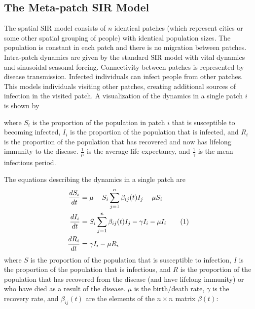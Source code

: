 \documentclass[twocolumn,nofootinbib,showkeys,twoside,floatfix,unsortedaddress,flushbottom,10pt,aps,pra]{report}
\newcommand\numberthis{\addtocounter{equation}{1}\tag{\theequation}}
\begin{document}
\subsection{The Meta-patch SIR Model} 
\indent
The spatial SIR model consists of $n$ identical patches (which represent cities or some other spatial grouping of people) with identical population sizes. The population is constant in each patch and there is no migration between patches. Intra-patch dynamics are given by the standard SIR model with vital dynamics and sinusoidal seasonal forcing. Connectivity between patches is represented by disease transmission. Infected individuals can infect people from other patches. This models individuals visiting other patches, creating additional sources of infection in the visited patch. 
A visualization of the dynamics in a single patch $i$ is shown by
\begin{center}
\end{center}
\qquad
where $S_i$ is the proportion of the population in patch $i$ that is susceptible to becoming infected, $I_i$ is the proportion of the population that is infected, and $R_i$ is the proportion of the population that has recovered and now has lifelong immunity to the disease. $\frac{1}{\mu}$ is the average life expectancy, and $\frac{1}{\gamma}$ is the mean infectious period.
\par
 \smallskip \qquad
The equations describing the dynamics in a single patch are
\begin{align*}
  \frac{dS_i}{dt} &= \mu - S_i\sum\limits_{j=1}^{n}\beta_{ij}(t) I_j -\mu S_i \\ 
  \frac{dI_i}{dt} &= S_i\sum\limits_{j=1}^{n}\beta_{ij}(t) I_j -\gamma I_i - \mu I_i  \numberthis \label{model} \\
  \frac{dR_i}{dt} &= \gamma I_i -\mu R_i      
\end{align*}
where $S$ is the proportion of the population that is susceptible to infection, $I$ is the proportion of the population that is infectious, and $R$ is the proportion of the population that has recovered from the disease (and  have lifelong immunity) or who have died as a result of the disease. $\mu$ is the birth/death rate, $\gamma$ is the recovery rate, and $\beta_{ij}(t)$ are the elements of the $n\times n$ matrix $\beta(t)$:
\end{document}
